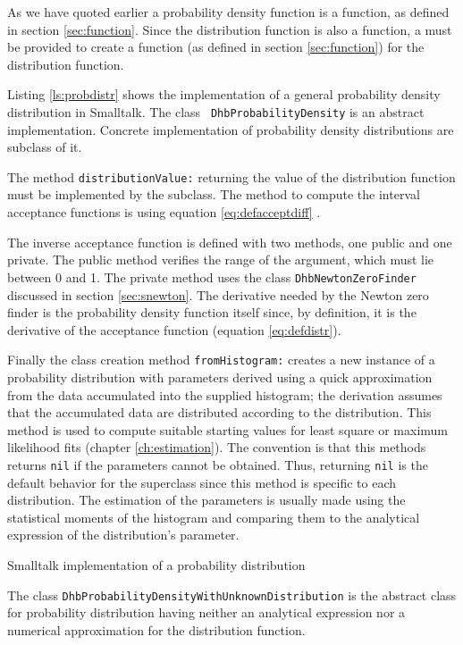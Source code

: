 As we have quoted earlier a probability density function is a
function, as defined in section \ref{sec:function}. Since the
distribution function is also a function, a 
must be provided to create a function (as defined in section
\ref{sec:function}) for the distribution function.

Listing \ref{ls:probdistr} shows the implementation of a general
probability density distribution in Smalltalk. The class {\tt
DhbProbabilityDensity} is an abstract implementation. Concrete
implementation of probability density distributions are subclass
of it.

The method {\tt distributionValue:} returning the value of the
distribution function must be implemented by the subclass. The
method to compute the interval acceptance functions is using
equation \ref{eq:defacceptdiff} .

The inverse acceptance function is defined with two methods, one
public and one private. The public method verifies the range of
the argument, which must lie between 0 and 1. The private method
uses the class {\tt DhbNewtonZeroFinder} discussed in section
\ref{sec:snewton}. The derivative needed by the Newton zero finder
is the probability density function itself since, by definition,
it is the derivative of the acceptance function (\cf equation
\ref{eq:defdistr}).

Finally the class creation method {\tt fromHistogram:} creates a
new instance of a probability distribution with parameters derived
using a quick approximation from the data accumulated into the
supplied histogram; the derivation assumes that the accumulated
data are distributed according to the distribution. This method is
used to compute suitable starting values for least square or
maximum likelihood fits (\cf chapter \ref{ch:estimation}). The
convention is that this methods returns {\tt nil} if the
parameters cannot be obtained. Thus, returning {\tt nil} is the
default behavior for the superclass since this method is specific
to each distribution. The estimation of the parameters is usually
made using the statistical moments of the histogram and comparing
them to the analytical expression of the distribution's parameter.

\begin{listing} Smalltalk implementation of a probability distribution
\label{ls:probdistr}

\end{listing}

The class {\tt DhbProbabilityDensityWithUnknownDistribution} is
the abstract class for probability distribution having neither an
analytical expression nor a numerical approximation for the
distribution function.


